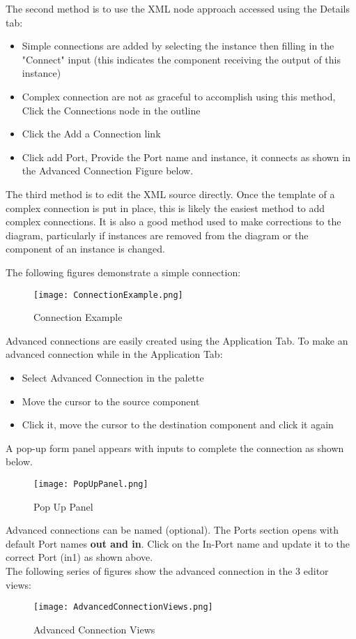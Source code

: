 The second method is to use the XML node approach accessed using the Details tab:
\begin{itemize}
\item	Simple connections are added by selecting the instance then filling in the "Connect" input (this indicates the component receiving the output of this instance)
\item	Complex connection are not as graceful to accomplish using this method, Click the Connections node in the outline
\item	Click the Add a Connection link
\item	Click add Port, Provide the Port name and instance, it connects as shown in the Advanced Connection Figure below.
\end{itemize}
The third method is to edit the XML source directly. Once the template of a complex connection is put in place, this is likely the easiest method to add complex connections. It is also a good method used to make corrections to the diagram, particularly if instances are removed from the diagram or the component of an instance is changed.

The following figures demonstrate a simple connection:\\
\begin{figure}[h!]
	\centering
	\caption{Connection Example}{}
	\texttt{[image: ConnectionExample.png]}
 \end{figure}
Advanced connections are easily created using the Application Tab. To make an advanced connection while in the Application Tab:
\begin{itemize}
\item	Select Advanced Connection in the palette
\item	Move the cursor to the source component
\item	Click it, move the cursor to the destination component and click it again
\end{itemize}
A pop-up form panel appears with inputs to complete the connection as shown below.
\begin{figure}[h!]
	\centering
	\caption{Pop Up Panel}{}
	\texttt{[image: PopUpPanel.png]}
 \end{figure}
Advanced connections can be named (optional). The Ports section opens with default Port names \textbf{out and in}. Click on the In-Port name and update it to the correct Port (in1) as shown above.\\

The following series of figures show the advanced connection in the 3 editor views:
\begin{figure}[h!]
	\centering
	\caption{Advanced Connection Views}{}
	\texttt{[image: AdvancedConnectionViews.png]}
 \end{figure}

